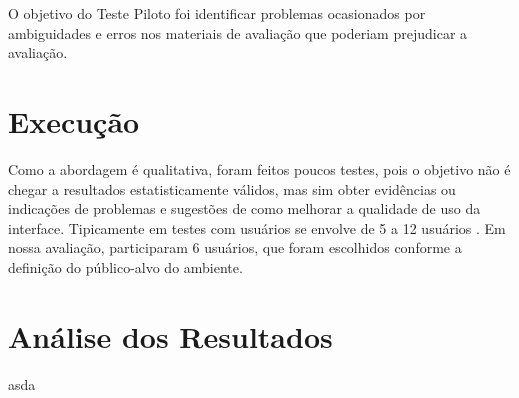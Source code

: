 O objetivo do Teste Piloto foi identificar problemas ocasionados por ambiguidades e erros nos materiais de avaliação que poderiam prejudicar a avaliação. 

\section{Execução}

Como a abordagem é qualitativa, foram feitos poucos testes, pois o objetivo não é chegar a resultados estatisticamente válidos, mas sim obter evidências ou indicações de problemas e sugestões de como melhorar a qualidade de uso da interface. Tipicamente em testes com usuários se envolve de 5 a 12 usuários \cite{dumas1999practical}. Em nossa avaliação, participaram 6 usuários, que foram escolhidos conforme a definição do público-alvo do ambiente.

\section{An\'alise dos Resultados}
asda